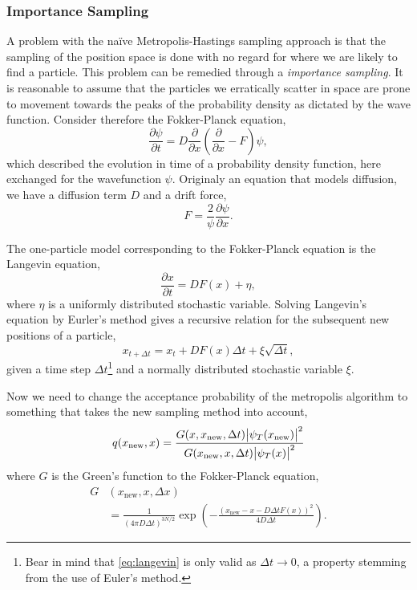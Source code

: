 \documentclass[
    a4paper, aps, twocolumn, floatfix, superscriptaddress, nofootinbib]{revtex4-1}
\newcommand{\1}{\mathds{1}}
\begin{document}
\subsubsection{Importance Sampling}
A problem with the naïve Metropolis-Hastings sampling approach is that the sampling of the position space is done with 
no regard for where we are likely to find a particle. This problem can be remedied through a \emph{importance sampling}. 
It is reasonable to assume that the particles we erratically scatter in space are prone to movement towards the peaks 
of the probability density as dictated by the wave function. Consider therefore the Fokker-Planck equation,
\begin{equation}
	\frac{\partial \psi}{\partial t} = D \frac{\partial }{\partial x}\left(\frac{\partial }{\partial x} - F \right) \psi,	
	\label{eq:fokker_planck}
\end{equation}
which described the evolution in time of a probability density function, here exchanged for the wavefunction $\psi$. 
Originaly an equation that models diffusion, we have a diffusion term $D$ and a drift force, 
\begin{equation}
	F = \frac{2}{\psi} \frac{\partial \psi}{\partial x}.
\end{equation}

The one-particle model corresponding to the Fokker-Planck equation is the Langevin equation,
\begin{equation}
	\frac{\partial x}{\partial t} = D F(x) + \eta,
	\label{eq:langevin}
\end{equation}
where $\eta$ is a uniformly distributed stochastic variable. Solving Langevin's equation by Eurler's method gives a recursive relation for
the subsequent new positions of a particle,
\begin{equation}
	x_{t+\Delta t} = x_t + D F(x) \Delta t +\xi \sqrt{\Delta t},
\end{equation}
given a time step $\Delta t$\footnote{Bear in mind that \autoref{eq:langevin} is only valid as $\Delta t \to 0$, a property stemming from the use of Euler's method.} and a normally distributed stochastic variable $\xi$.

Now we need to change the acceptance probability of the metropolis algorithm to something that takes 
the new sampling method into account,
\begin{equation}
	q(x_{\text{new}}, x) = \frac{G(x, x_{\text{new}}, \Delta t)\abs{\psi_T(x_{\text{new}})}^2}{G(x_{\text{new}}, x, \Delta t)\abs{\psi_T(x)}^2}
\end{equation}
where $G$ is the Green's function to the Fokker-Planck equation,
\begin{align}
	G&(x_{\text{new}}, x, \Delta x) \nonumber \\
	&= \frac{1}{(4\pi D \Delta t)^{3N/2}}\exp\left(-\frac{(x_{\text{new}} - x - D\Delta t F(x))^2}{4D\Delta t} \right).
\end{align}
\end{document}
